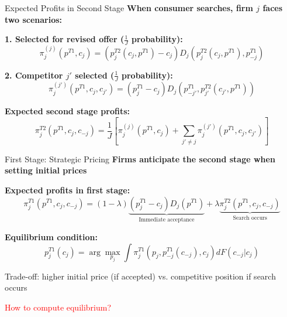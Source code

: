 \documentclass[10pt,aspectratio=169]{beamer}
\begin{document}

\begin{frame}{Expected Profits in Second Stage}
\textbf{When consumer searches, firm $j$ faces two scenarios:}

\vspace{0.3cm}

\textbf{1. Selected for revised offer ($\frac{1}{J}$ probability):}
$$\pi^{(j)}_j(p^{T1}, c_j) = (p^{T2}_j(c_j, p^{T1}) - c_j) D_j(p^{T2}_j(c_j, p^{T1}), p^{T1}_{-j})$$

\vspace{0.3cm}

\textbf{2. Competitor $j'$ selected ($\frac{1}{J}$ probability):}
$$\pi^{(j')}_j(p^{T1}, c_j, c_{j'}) = (p^{T1}_j - c_j) D_j(p^{T1}_{-j'}, p^{T2}_{j'}(c_{j'}, p^{T1}))$$

\vspace{0.5cm}

\textbf{Expected second stage profits:}
$$\pi^{T2}_j(p^{T1}, c_j, c_{-j}) = \frac{1}{J}\left[\pi^{(j)}_j(p^{T1}, c_j) + \sum_{j' \neq j} \pi^{(j')}_j(p^{T1}, c_j, c_{j'})\right]$$
\end{frame}


 
\begin{frame}{First Stage: Strategic Pricing}
\textbf{Firms anticipate the second stage when setting initial prices}

\vspace{0.5cm}

\textbf{Expected profits in first stage:}
$$\pi^{T1}_j(p^{T1}, c_j, c_{-j}) = (1-\lambda)\underbrace{(p^{T1}_j - c_j)D_j(p^{T1})}_{\text{Immediate acceptance}} + \lambda \underbrace{\pi^{T2}_j(p^{T1}, c_j, c_{-j})}_{\text{Search occurs}}$$

\vspace{0.5cm}

\textbf{Equilibrium condition:}
$$p^{T1}_j(c_j) = \arg\max_{p_j} \int \pi^{T1}_j(p_j, p^{T1}_{-j}(c_{-j}), c_j) dF(c_{-j}|c_j)$$

\vspace{0.3cm}
Trade-off: higher initial price (if accepted) vs. competitive position if search occurs

\textcolor{red}{How to compute equilibrium?}
\end{frame}
\end{document}
